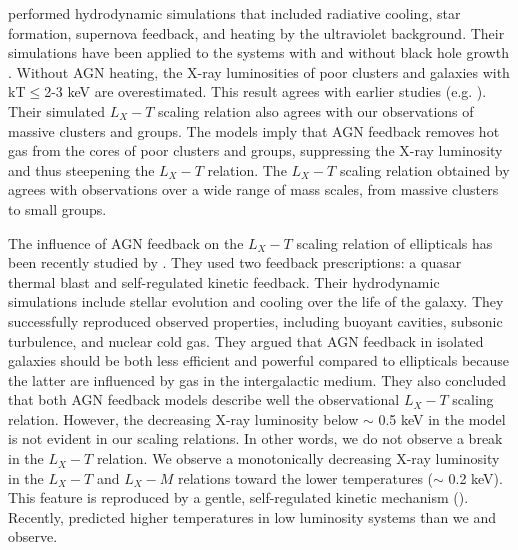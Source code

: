 \documentclass[iop]{emulateapj}
\begin{document}
\citet{Puchwein:08} performed hydrodynamic simulations that included radiative cooling, star formation, supernova feedback, and heating by the ultraviolet background. Their simulations have been applied to the systems with and without black hole growth \citep{Sijacki:07}. Without AGN heating, the X-ray luminosities of poor clusters and galaxies with kT$\leq$2-3 keV are overestimated. This result agrees with earlier studies (e.g. \citealt{Borgani:04, Khos:04, Sijacki:06, Nagai:07, Schaye:10, Gaspari:12, Gaspari:14, Anderson:14, Anderson:15}). Their simulated $L_X - T$ scaling relation also agrees with our observations of massive clusters and groups.  The models imply that AGN feedback removes hot gas from the cores of poor clusters and groups, suppressing the X-ray luminosity and thus steepening the $L_X - T$ relation.  The $L_X - T$ scaling relation obtained by \citet{Puchwein:08} agrees with observations over a wide range of mass scales, from massive clusters to small groups. 


The influence of AGN feedback on the $L_X - T$ scaling relation of ellipticals has been recently studied by \citet{Gaspari:12, Gaspari:14}.  They used two feedback prescriptions: a quasar thermal blast and self-regulated kinetic feedback. Their hydrodynamic simulations include stellar evolution and cooling over the life of the galaxy. They successfully reproduced observed properties, including buoyant cavities, subsonic turbulence, and nuclear cold gas. They argued that AGN feedback in isolated galaxies should be both less efficient and powerful compared to ellipticals because the latter are influenced by gas in the intergalactic medium. They also concluded that both AGN feedback models describe well the observational $L_X - T$ scaling relation. However, the decreasing  X-ray luminosity below $\sim$ 0.5 keV in the model is not evident in our scaling relations. In other words, we do not observe a break in the $L_X - T$ relation. We observe a monotonically decreasing X-ray luminosity in the $L_X - T$ and $L_X - M$ relations toward the lower temperatures ($\sim$ 0.2 keV). This feature is reproduced by a gentle, self-regulated kinetic mechanism (\citealt{Anderson:14, Anderson:15}). Recently, \citet{Negri:14} predicted higher temperatures in low luminosity systems than  we and \citet{Kim:15} observe.
\end{document}
